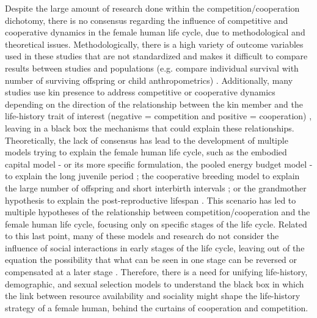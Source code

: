 \documentclass{article}
\begin{document}
Despite the large amount of research done within the competition/cooperation dichotomy, there is no consensus regarding the influence of competitive and cooperative dynamics in the female human life cycle, due to methodological and theoretical issues. Methodologically, there is a high variety of outcome variables used in these studies that are not standardized and makes it difficult to compare results between studies and populations (e.g. compare   individual survival with number of surviving offspring or child anthropometrics) \citep{brown2002reconsidering}. Additionally, many studies use kin presence to address competitive or cooperative dynamics depending on the direction of the relationship between the kin member and the life-history trait of interest (negative = competition and positive = cooperation) \citep{sear2011much}, leaving in a black box the mechanisms that could explain these relationships. Theoretically, the lack of consensus has lead to the development of multiple models trying to explain the female human life cycle, such as the embodied capital model - or its more specific formulation, the pooled energy budget model - to explain the long juvenile period \citep{kaplan2000theory,kramer2010pooled}; the cooperative breeding model to explain the large number of offspring and short interbirth intervals \citep{kramer2005children}; or the grandmother hypothesis to explain the post-reproductive lifespan \citep{hawkes2013grandmothers}. This scenario has led to multiple hypotheses of the relationship between competition/cooperation and the female human life cycle, focusing only on specific stages of the life cycle. Related to this last point, many of these models and research do not consider the influence of social interactions in early stages of the life cycle, leaving out of the equation the possibility that what can be seen in one stage can be reversed or compensated at a later stage \citep{mulder1998demographic}. Therefore, there is a need for unifying life-history, demographic, and sexual selection models to understand the black box in which the link between resource availability and sociality might shape the life-history strategy of a female human, behind the curtains of cooperation and competition.
\\\\
\end{document}
